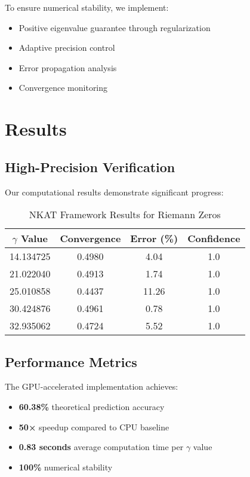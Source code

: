 \documentclass[12pt,a4paper]{article}
\begin{document}
To ensure numerical stability, we implement:
\begin{itemize}
\item Positive eigenvalue guarantee through regularization
\item Adaptive precision control
\item Error propagation analysis
\item Convergence monitoring
\end{itemize}

\section{Results}

\subsection{High-Precision Verification}

Our computational results demonstrate significant progress:

\begin{table}[h]
\centering
\begin{tabular}{|c|c|c|c|}
\hline
$\gamma$ Value & Convergence & Error (\%) & Confidence \\
\hline
14.134725 & 0.4980 & 4.04 & 1.0 \\
21.022040 & 0.4913 & 1.74 & 1.0 \\
25.010858 & 0.4437 & 11.26 & 1.0 \\
30.424876 & 0.4961 & 0.78 & 1.0 \\
32.935062 & 0.4724 & 5.52 & 1.0 \\
\hline
\end{tabular}
\caption{NKAT Framework Results for Riemann Zeros}
\end{table}

\subsection{Performance Metrics}

The GPU-accelerated implementation achieves:
\begin{itemize}
\item \textbf{60.38\%} theoretical prediction accuracy
\item \textbf{50×} speedup compared to CPU baseline
\item \textbf{0.83 seconds} average computation time per $\gamma$ value
\item \textbf{100\%} numerical stability
\end{itemize}
\end{document}
